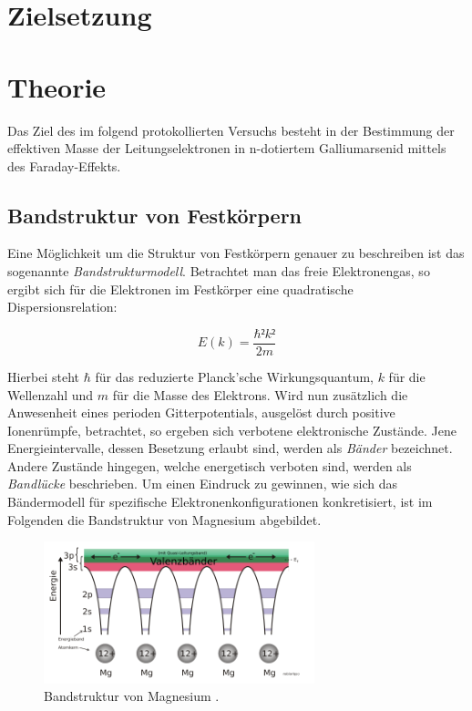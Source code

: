 %

%
\section{Zielsetzung}
\label{sec:Theorie}

\section{Theorie}

Das Ziel des im folgend protokollierten Versuchs besteht in der Bestimmung der effektiven Masse der Leitungselektronen in 
n-dotiertem Galliumarsenid mittels des Faraday-Effekts. 

\subsection{Bandstruktur von Festkörpern}

\noindent Eine Möglichkeit um die Struktur von Festkörpern genauer zu beschreiben ist das sogenannte \textit{Bandstrukturmodell}. Betrachtet man das 
freie Elektronengas, so ergibt sich für die Elektronen im Festkörper eine quadratische Dispersionsrelation:

\begin{equation}
    E(k) = \frac{\hbar²{}k²}{2m}
\end{equation}

\noindent Hierbei steht $\hbar$ für das reduzierte Planck'sche Wirkungsquantum, $k$ für die Wellenzahl und $m$ für die Masse des Elektrons.
Wird nun zusätzlich die Anwesenheit eines perioden Gitterpotentials, ausgelöst durch positive Ionenrümpfe, betrachtet, so ergeben sich verbotene
elektronische Zustände. Jene Energieintervalle, dessen Besetzung erlaubt sind, werden als \textit{Bänder} bezeichnet. Andere Zustände hingegen, welche
energetisch verboten sind, werden als \textit{Bandlücke} beschrieben. Um einen Eindruck zu gewinnen, wie sich das Bändermodell für spezifische
Elektronenkonfigurationen konkretisiert, ist im Folgenden die Bandstruktur von Magnesium abgebildet. 

\begin{figure}[H]
    \centering
    \includegraphics[width=0.7\textwidth]{content/BandstrukturMagn.png}
    \caption{Bandstruktur von Magnesium \cite{Magnesium}.}
    \label{fig:Magnesium}
\end{figure}

